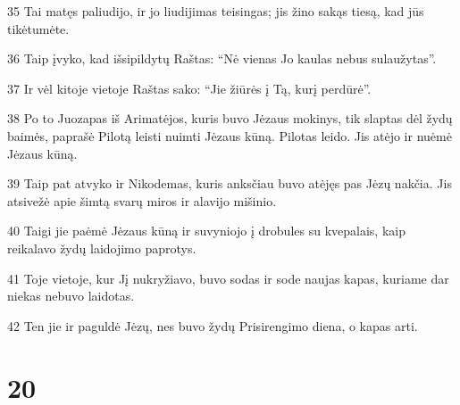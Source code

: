 \par 35 Tai matęs paliudijo, ir jo liudijimas teisingas; jis žino sakąs tiesą, kad jūs tikėtumėte. 
\par 36 Taip įvyko, kad išsipildytų Raštas: “Nė vienas Jo kaulas nebus sulaužytas”. 
\par 37 Ir vėl kitoje vietoje Raštas sako: “Jie žiūrės į Tą, kurį perdūrė”. 
\par 38 Po to Juozapas iš Arimatėjos, kuris buvo Jėzaus mokinys, tik slaptas dėl žydų baimės, paprašė Pilotą leisti nuimti Jėzaus kūną. Pilotas leido. Jis atėjo ir nuėmė Jėzaus kūną. 
\par 39 Taip pat atvyko ir Nikodemas, kuris anksčiau buvo atėjęs pas Jėzų nakčia. Jis atsivežė apie šimtą svarų miros ir alavijo mišinio. 
\par 40 Taigi jie paėmė Jėzaus kūną ir suvyniojo į drobules su kvepalais, kaip reikalavo žydų laidojimo paprotys. 
\par 41 Toje vietoje, kur Jį nukryžiavo, buvo sodas ir sode naujas kapas, kuriame dar niekas nebuvo laidotas. 
\par 42 Ten jie ir paguldė Jėzų, nes buvo žydų Prisirengimo diena, o kapas arti.


\chapter{20}


